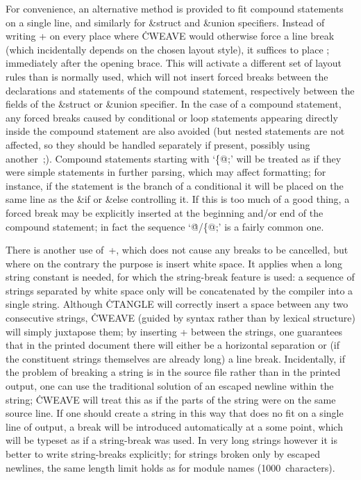 For convenience, an alternative method is provided to fit compound
statements on a single line, and similarly for \&{struct} and \&{union}
specifiers. Instead of writing \:+ on every place where \.{CWEAVE} would
otherwise force a line break (which incidentally depends on the chosen
layout style), it suffices to place \:; immediately after the opening brace.
This will activate a different set of layout rules than is normally used,
which will not insert forced breaks between the declarations and statements
of the compound statement, respectively between the fields of the \&{struct}
or \&{union} specifier. In the case of a compound statement, any forced
breaks caused by conditional or loop statements appearing directly inside
the compound statement are also avoided (but nested statements are not
affected, so they should be handled separately if present, possibly using
another~\:;). Compound statements starting with `\.{\{@;}' will be treated
as if they were simple statements in further parsing, which may affect
formatting; for instance, if the statement is the branch of a conditional it
will be placed on the same line as the \&{if} or \&{else} controlling it.
If this is too much of a good thing, a forced break may be explicitly
inserted at the beginning and/or end of the compound statement; in fact the
sequence `\.{@/\{@;}' is a fairly common one.

There is another use of~\:+, which does not cause any breaks to be
cancelled, but where on the contrary the purpose is insert white space.
It applies when a long string constant is needed, for which the
string-break feature is used: a sequence of strings separated by white space
only will be concatenated by the compiler into a single string. Although
\.{CTANGLE} will correctly insert a space between any two consecutive
strings, \.{CWEAVE} (guided by syntax rather than by lexical structure) will
simply juxtapose them; by inserting \:+ between the strings, one guarantees
that in the printed document there will either be a horizontal separation or
(if the constituent strings themselves are already long) a line break.
Incidentally, if the problem of breaking a string is in the source file
rather than in the printed output, one can use the traditional solution of
an escaped newline within the string; \.{CWEAVE} will treat this as if the
parts of the string were on the same source line. If one should create a
string in this way that does no fit on a single line of output, a break will
be introduced automatically at a some point, which will be typeset as if a
string-break was used. In very long strings however it is better to write
string-breaks explicitly; for strings broken only by escaped newlines, the
same length limit holds as for module names (1000~characters).

